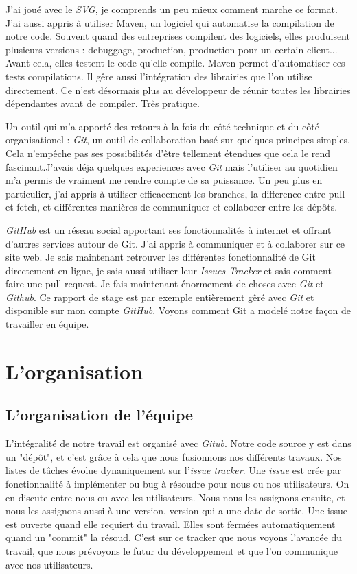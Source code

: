 J'ai joué avec le \textit{SVG}, je comprends un peu mieux comment marche ce format. J'ai aussi appris à utiliser Maven, un logiciel qui automatise la compilation de notre code. Souvent quand des entreprises compilent des logiciels, elles produisent plusieurs versions : debuggage, production, production pour un certain client... Avant cela, elles testent le code qu'elle compile. Maven permet d'automatiser ces tests compilations. Il gêre aussi l'intégration des librairies que l'on utilise directement. Ce n'est désormais plus au développeur de réunir toutes les librairies dépendantes avant de compiler. Très pratique. 

Un outil qui m'a apporté des retours à la fois du côté technique et du côté organisationel : \textit{Git}, un outil de collaboration  basé sur quelques principes simples. Cela n'empêche pas ses possibilités d'être tellement étendues que cela le rend fascinant.J'avais déja quelques experiences avec \textit{Git} mais l'utiliser au quotidien m'a permis de vraiment me rendre compte de sa puissance. Un peu plus en particulier, j'ai appris à utiliser efficacement les branches, la difference entre pull et fetch, et différentes manières de communiquer et collaborer entre les dépôts.

\textit{GitHub} est un réseau social apportant ses fonctionnalités à internet et offrant d'autres services autour de Git. J'ai appris à communiquer et à collaborer sur ce site web. Je sais maintenant retrouver les différentes fonctionnalité de Git directement en ligne, je sais aussi utiliser leur \textit{Issues Tracker} et sais comment faire une pull request. Je fais maintenant énormement de choses avec \textit{Git} et \textit{Github}. Ce rapport de stage est par exemple entièrement gêré avec \textit{Git} et disponible sur mon compte \textit{GitHub}.
Voyons comment Git a modelé notre façon de travailler en équipe.


\section{L'organisation}

\subsection{L'organisation de l'équipe}
L'intégralité de notre travail est organisé avec \textit{Gitub}. Notre code source y est dans un "dépôt", et c'est grâce à cela que nous fusionnons nos différents travaux. Nos listes de tâches évolue dynaniquement sur l'\textit{issue tracker}. Une \textit{issue} est crée par fonctionnalité à implémenter ou bug à résoudre pour nous ou nos utilisateurs. On en discute entre nous ou avec les utilisateurs. Nous nous les assignons ensuite, et nous les assignons aussi à une version, version qui a une date de sortie. Une issue est ouverte quand elle requiert du travail. Elles sont fermées automatiquement quand un "commit" la résoud. C'est sur ce tracker que nous voyons l'avancée du travail, que nous prévoyons le futur du développement et que l'on communique avec nos utilisateurs.

